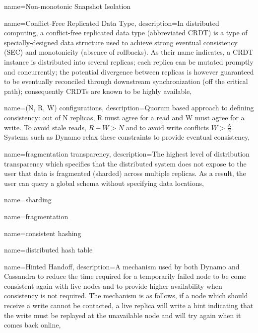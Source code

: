  {
    name={Non-monotonic Snapshot Isolation}
}

 {
  name={Conflict-Free Replicated Data Type},
  description={In distributed computing, a conflict-free replicated data type (abbreviated CRDT) is a type of specially-designed data structure used to achieve strong eventual consistency (SEC) and monotonicity (absence of rollbacks). As their name indicates, a CRDT instance is distributed into several replicas; each replica can be mutated promptly and concurrently; the potential divergence between replicas is however guaranteed to be eventually reconciled through downstream synchronization (off the critical path); consequently CRDTs are known to be highly available},
}

 {
    name={(N, R, W) configurations},
    description={Quorum based approach to defining consistency: out of N replicas, R must agree for a read and W must agree for a write. To avoid stale reads, $R+W > N$ and to avoid write conflicts $W > \frac {N} {2}$. Systems such as Dynamo relax these constraints to provide eventual consistency},
}

 {
    name={fragmentation transparency},
    description={The highest level of distribution transparency which specifies that the distributed system does not expose to the user that data is fragmented (sharded) across multiple replicas. As a result, the user can query a global schema without specifying data locations},
}

 {
    name={sharding}
}

 {
    name={fragmentation}
}

 {
    name={consistent hashing}
}

 {
    name={distributed hash table}
}

 {
    name={Hinted Handoff},
    description={A mechanism used by both Dynamo and Cassandra to reduce the time required for a temporarily failed node to be come consistent again with live nodes and to provide higher availability when consistency is not required. The mechanism is as follows, if a node which should receive a write cannot be contacted, a live replica will write a hint indicating that the write must be replayed at the unavailable node and will try again when it comes back online},
}



